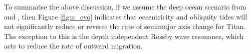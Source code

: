 To summarise the above discussion, if we assume the deep ocean scenario from \citet{sohl2014structural} and \citet{baland2014titan}, then Figure \ref{fig:a_evo} indicates that eccentricity and obliquity tides will not significantly reduce or reverse the rate of semimajor axis change for Titan. The exception to this is the depth independent Rossby wave resonance, which acts to reduce the rate of outward migration.







  

